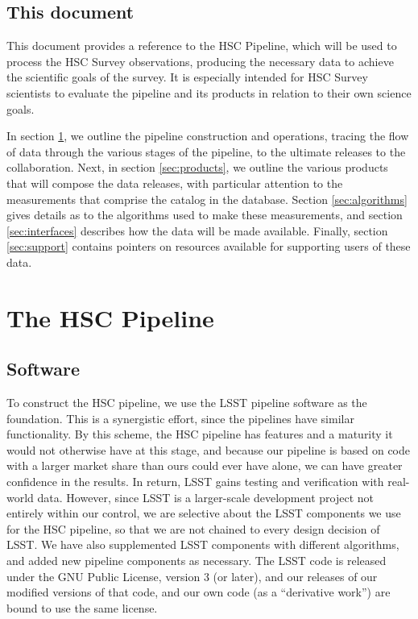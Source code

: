 \documentclass[12pt]{article}
\begin{document}
\subsection{This document}

This document provides a reference to the HSC Pipeline, which will be
used to process the HSC Survey observations, producing the necessary
data to achieve the scientific goals of the survey.  It is
especially intended for HSC Survey scientists to evaluate the pipeline
and its products in relation to their own science goals.

In section \ref{sec:pipeline}, we outline the pipeline construction and operations, tracing the flow of data
through the various stages of the pipeline, to the ultimate releases to the collaboration.  Next, in section
\ref{sec:products}, we outline the various products that will compose the data releases, with particular
attention to the measurements that comprise the catalog in the database.  Section \ref{sec:algorithms} gives
details as to the algorithms used to make these measurements, and section \ref{sec:interfaces} describes how
the data will be made available.  Finally, section \ref{sec:support} contains pointers on resources available
for supporting users of these data.


\section{The HSC Pipeline}
\label{sec:pipeline}
\subsection{Software}


To construct the HSC pipeline, we use the LSST pipeline software as the foundation.  This is a synergistic
effort, since the pipelines have similar functionality.  By this scheme, the HSC pipeline has features and a
maturity it would not otherwise have at this stage, and because our pipeline is based on code with a larger
market share than ours could ever have alone, we can have greater confidence in the results.  In return, LSST
gains testing and verification with real-world data.  However, since LSST is a larger-scale development
project not entirely within our control, we are selective about the LSST components we use for the HSC
pipeline, so that we are not chained to every design decision of LSST.  We have also supplemented LSST
components with different algorithms, and added new pipeline components as necessary.  The LSST code is
released under the GNU Public License, version 3 (or later), and our releases of our modified versions of that
code, and our own code (as a ``derivative work'') are bound to use the same license.
\end{document}
